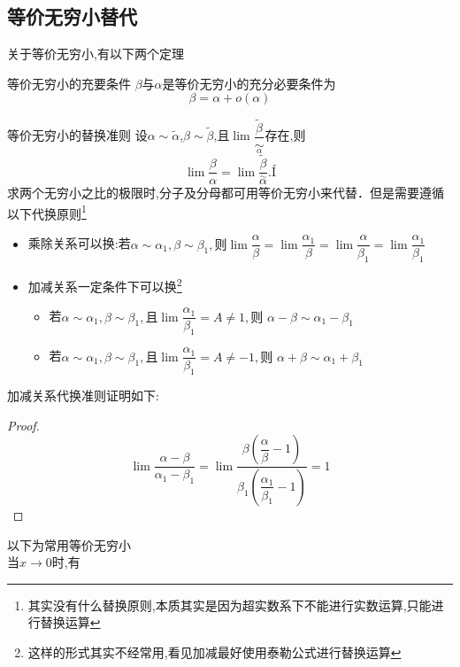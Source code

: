 \documentclass[12pt, a4paper, oneside, UTF8]{ctexbook}
\begin{document}
\begin{sloppypar}
    \subsection{等价无穷小替代}
    关于等价无穷小,有以下两个定理
    \begin{defn}{等价无穷小的充要条件}{}
        $\beta$与$\alpha$是等价无穷小的充分必要条件为
        $$
            \beta=\alpha + o(\alpha)
        $$
    \end{defn}
    \begin{defn}{等价无穷小的替换准则}{}
        设$\alpha\sim\widetilde{\alpha}$,$\beta\sim\widetilde{\beta}$,且$\lim\dfrac{\widetilde{\beta}}{\underset{\alpha}{\operatorname*{\sim}}}$存在,则
        $$
            \lim\dfrac{\beta}{\alpha}=\lim\dfrac{\widetilde{\beta}}{\overset{\sim}{\alpha}}.Í
        $$
        求两个无穷小之比的极限时,分子及分母都可用等价无穷小来代替．但是需要遵循以下代换原则\footnote{其实没有什么替换原则,本质其实是因为超实数系下不能进行实数运算,只能进行替换运算}
        \begin{itemize}
            \item 乘除关系可以换:若$\alpha\sim\alpha_1,\beta\sim\beta_1,\text{则}\lim\dfrac\alpha\beta=\lim\dfrac{\alpha_1}\beta=\lim\dfrac\alpha{\beta_1}=\lim\dfrac{\alpha_1}{\beta_1}$
            \item 加减关系一定条件下可以换\footnote{这样的形式其实不经常用,看见加减最好使用泰勒公式进行替换运算}
                  \begin{itemize}
                      \item 若$\alpha\sim\alpha_{1},\beta\sim\beta_{1},\text{且}\operatorname*{lim}\dfrac{\alpha_{1}}{\beta_{1}}=A\neq1,\text{则 }\alpha-\beta\sim\alpha_{1}-\beta_{1}$
                      \item 若$\alpha\sim\alpha_{1},\beta\sim\beta_{1},\text{且}\operatorname*{lim}\dfrac{\alpha_{1}}{\beta_{1}}=A\neq-1,\text{则 }\alpha+\beta\sim\alpha_{1}+\beta_{1}$
                  \end{itemize}
        \end{itemize}
        加减关系代换准则证明如下:
        \begin{proof}
            $$\lim \dfrac{\alpha-\beta}{\alpha_1 -\beta_1}=\lim \dfrac{\beta (\dfrac{\alpha}{\beta}-1)}{\beta_1(\dfrac{\alpha_1}{\beta_1}-1)}=1$$
        \end{proof}
    \end{defn}
    以下为常用等价无穷小
    \\当$x \to 0$时,有
    \begin{enumerate}

\end{enumerate}
\end{sloppypar}
\end{document}
